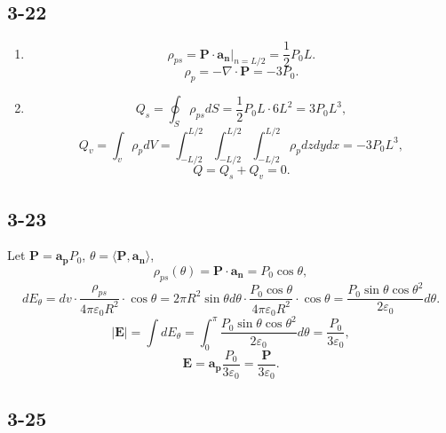 \documentclass[11pt,a4paper]{article}
\author{\href{liuyh615@sjtu.edu.cn}{Yihao Liu} (515370910207)}
\subtitle{Homework}
\begin{document}
\maketitle

\subsection{3-22}
\begin{enumerate}[label=\alph*)]
\item 
$$\rho_{ps}=\mathbf{P}\cdot\mathbf{a_n}|_{n=L/2}=\frac{1}{2}P_0L.$$
$$\rho_p=-\nabla\cdot\mathbf{P}=-3P_0.$$
\item
$$Q_s=\oint_S\rho_{ps}dS=\frac{1}{2}P_0L\cdot 6L^2=3P_0L^3,$$
$$Q_v=\int_v\rho_pdV=\int_{-L/2}^{L/2}\int_{-L/2}^{L/2}\int_{-L/2}^{L/2}\rho_pdzdydx=-3P_0L^3,$$
$$Q=Q_s+Q_v=0.$$
\end{enumerate}

\subsection{3-23}
Let $\mathbf{P}=\mathbf{a_p}P_0$, $\theta=\langle \mathbf{P},\mathbf{a_n} \rangle$,
$$\rho_{ps}(\theta)=\mathbf{P}\cdot\mathbf{a_n}=P_0\cos\theta,$$
$$dE_\theta=dv\cdot\frac{\rho_{ps}}{4\pi\varepsilon_0R^2}\cdot\cos\theta=2\pi R^2\sin\theta d\theta\cdot\frac{P_0\cos\theta}{4\pi\varepsilon_0R^2}\cdot\cos\theta=\frac{P_0\sin\theta\cos\theta^2}{2\varepsilon_0}d\theta.$$
$$|\mathbf{E}|=\int dE_\theta=\int_0^\pi\frac{P_0\sin\theta\cos\theta^2}{2\varepsilon_0}d\theta=\frac{P_0}{3\varepsilon_0},$$
$$\mathbf{E}=\mathbf{a_p}\frac{P_0}{3\varepsilon_0}=\frac{\mathbf{P}}{3\varepsilon_0}.$$

\subsection{3-25}
\end{document}
